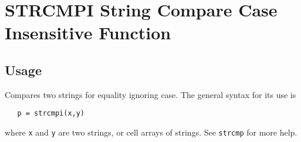 \section{STRCMPI String Compare Case Insensitive Function}

\subsection{Usage}

Compares two strings for equality ignoring case.  The general
syntax for its use is 
\begin{verbatim}
   p = strcmpi(x,y)
\end{verbatim}
where \verb|x| and \verb|y| are two strings, or cell arrays of strings.
See \verb|strcmp| for more help.
